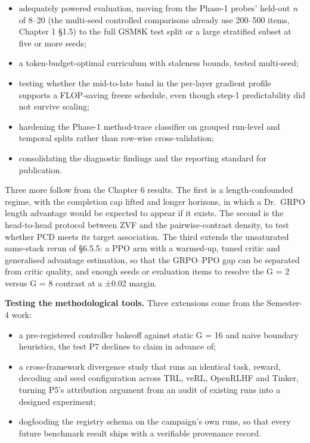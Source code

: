 \documentclass[12pt,a4paper]{report}
\providecommand{\tightlist}{%
  \setlength{\itemsep}{0pt}\setlength{\parskip}{0pt}}
\begin{document}
\begin{itemize}
\tightlist
\item
  adequately powered evaluation, moving from the Phase-1 probes'
  held-out \emph{n} of 8--20 (the multi-seed controlled comparisons
  already use 200--500 items, Chapter 1 §1.5) to the full GSM8K test
  split or a large stratified subset at five or more seeds;
\item
  a token-budget-optimal curriculum with staleness bounds, tested
  multi-seed;
\item
  testing whether the mid-to-late band in the per-layer gradient profile
  supports a FLOP-saving freeze schedule, even though step-1
  predictability did not survive scaling;
\item
  hardening the Phase-1 method-trace classifier on grouped run-level and
  temporal splits rather than row-wise cross-validation;
\item
  consolidating the diagnostic findings and the reporting standard for
  publication.
\end{itemize}

Three more follow from the Chapter 6 results. The first is a
length-confounded regime, with the completion cap lifted and longer
horizons, in which a Dr.~GRPO length advantage would be expected to
appear if it exists. The second is the head-to-head protocol between ZVF
and the pairwise-contrast density, to test whether PCD meets its target
association. The third extends the unsaturated same-stack rerun of
§6.5.5: a PPO arm with a warmed-up, tuned critic and generalised
advantage estimation, so that the GRPO--PPO gap can be separated from
critic quality, and enough seeds or evaluation items to resolve the G =
2 versus G = 8 contrast at a ±0.02 margin.

\textbf{Testing the methodological tools.} Three extensions come from
the Semester-4 work:

\begin{itemize}
\tightlist
\item
  a pre-registered controller bakeoff against static G = 16 and naive
  boundary heuristics, the test P7 declines to claim in advance of;
\item
  a cross-framework divergence study that runs an identical task,
  reward, decoding and seed configuration across TRL, veRL, OpenRLHF and
  Tinker, turning P5's attribution argument from an audit of existing
  runs into a designed experiment;
\item
  dogfooding the registry schema on the campaign's own runs, so that
  every future benchmark result ships with a verifiable provenance
  record.
\end{itemize}
\end{document}
